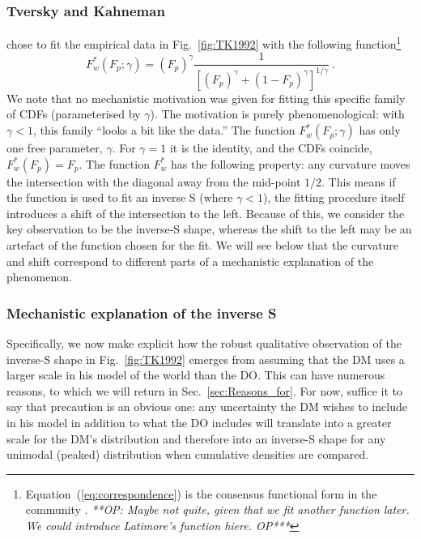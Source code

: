\documentclass[a4paper, 12pt]{article}
\newcommand{\elabel}[1]{\label{eq:#1}}
\newcommand{\Eref}[1]{Equation~(\ref{eq:#1})}
\newcommand{\fref}[1]{Fig.~\ref{fig:#1}}
\newcommand{\secref}[1]{Sec.~\ref{sec:#1}}
\newcommand{\be}{\begin{equation}}
\newcommand{\ee}{\end{equation}}
\newcommand{\OP}[1]{{\it ***OP: #1 OP***}}
\begin{document}
\subsubsection{Tversky and Kahneman}
\citet{TverskyKahneman1992} chose to fit the empirical data in \fref{TK1992} with the following function\footnote{\Eref{correspondence} is the consensus functional form in the community \cite{Barberis2013}. \OP{Maybe not quite, given that we fit another function later. We could introduce Latimore's function hiere.}}
% 
\be
\elabel{correspondence}
F_w^*\left(F_p; \gamma\right) = \left(F_p\right)^\gamma \frac{1}{\left[\left(F_p\right)^\gamma+\left(1-F_p\right)^\gamma\right]^{1/\gamma}} ~.
\ee
We note that no mechanistic motivation was given for fitting this specific family of CDFs (parameterised by $\gamma$). The motivation is purely phenomenological: with $\gamma<1$, this family ``looks a bit like the data.''
% 
The function $F_w^*\left(F_p; \gamma \right)$ has only one free parameter, $\gamma$. For $\gamma=1$ it is the identity, and the CDFs coincide, $F_w^*\left(F_p\right)=F_p$. The function $F_w^*$ has the following property: any curvature moves the intersection with the diagonal away from the mid-point $1/2$. This means if the function is used to fit an inverse S (where $\gamma<1$), the fitting procedure itself introduces a shift of the intersection to the left. Because of this, we consider the key observation to be the inverse-S shape, whereas the shift to the left may be an artefact of the function chosen for the fit. We will see below that the curvature and shift correspond to different parts of a mechanistic explanation of the phenomenon.

\subsubsection{Mechanistic explanation of the inverse S}
Specifically, we now make explicit how the robust qualitative observation of the inverse-S shape in \fref{TK1992} emerges from assuming that the DM uses a larger scale in his model of the world than the DO. This can have numerous reasons, to which we will return in \secref{Reasons_for}. For now, suffice it to say that precaution is an obvious one: any uncertainty the DM wishes to include in his model in addition to what the DO includes will translate into a greater scale for the DM's distribution and therefore into an inverse-S shape for any unimodal (peaked) distribution when cumulative densities are compared.
\end{document}

